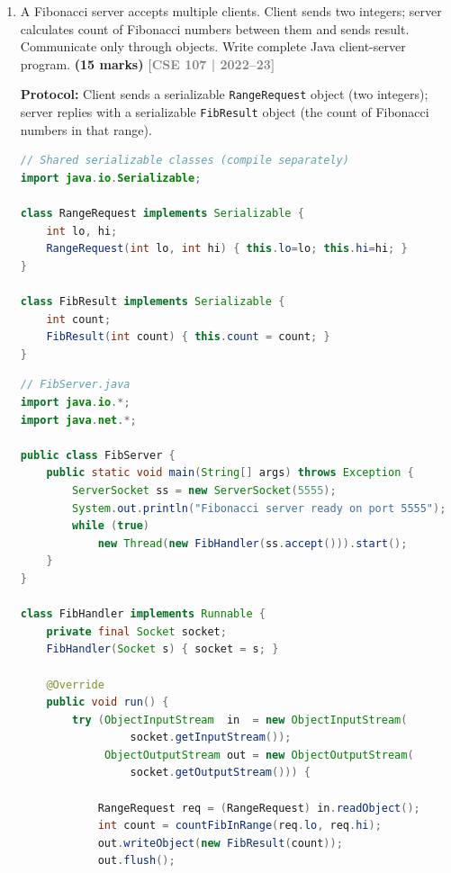 \documentclass[12pt,a3paper]{article}
\newcommand{\yr}[1]{\hfill\textcolor{gray}{\small\textbf{[#1]}}}
\newcommand{\mk}[1]{\textcolor{orange!70!black}{\small\textbf{(#1 marks)}}}
\begin{document}
\begin{enumerate}
\item A Fibonacci server accepts multiple clients. Client sends two integers; server calculates count of Fibonacci numbers between them and sends result. Communicate only through objects. Write complete Java client-server program. \mk{15}
\yr{CSE 107 | 2022--23}

\begin{tcolorbox}[enhanced,breakable,ansbox,
  colback=cB!4,colframe=cB,boxrule=0.8pt,arc=5pt,
  title={\textbf{Answer — Fibonacci Server: Object-Based
  Multi-Client TCP}},
  fonttitle=\bfseries\color{white},colbacktitle=cB]

\textbf{Protocol:} Client sends a serializable
\texttt{RangeRequest} object (two integers); server
replies with a serializable \texttt{FibResult} object
(the count of Fibonacci numbers in that range).

\begin{lstlisting}[language=Java]
// Shared serializable classes (compile separately)
import java.io.Serializable;

class RangeRequest implements Serializable {
    int lo, hi;
    RangeRequest(int lo, int hi) { this.lo=lo; this.hi=hi; }
}

class FibResult implements Serializable {
    int count;
    FibResult(int count) { this.count = count; }
}
\end{lstlisting}

\begin{lstlisting}[language=Java]
// FibServer.java
import java.io.*;
import java.net.*;

public class FibServer {
    public static void main(String[] args) throws Exception {
        ServerSocket ss = new ServerSocket(5555);
        System.out.println("Fibonacci server ready on port 5555");
        while (true)
            new Thread(new FibHandler(ss.accept())).start();
    }
}

class FibHandler implements Runnable {
    private final Socket socket;
    FibHandler(Socket s) { socket = s; }

    @Override
    public void run() {
        try (ObjectInputStream  in  = new ObjectInputStream(
                 socket.getInputStream());
             ObjectOutputStream out = new ObjectOutputStream(
                 socket.getOutputStream())) {

            RangeRequest req = (RangeRequest) in.readObject();
            int count = countFibInRange(req.lo, req.hi);
            out.writeObject(new FibResult(count));
            out.flush();


\end{lstlisting}
\end{tcolorbox}
\end{enumerate}
\end{document}
